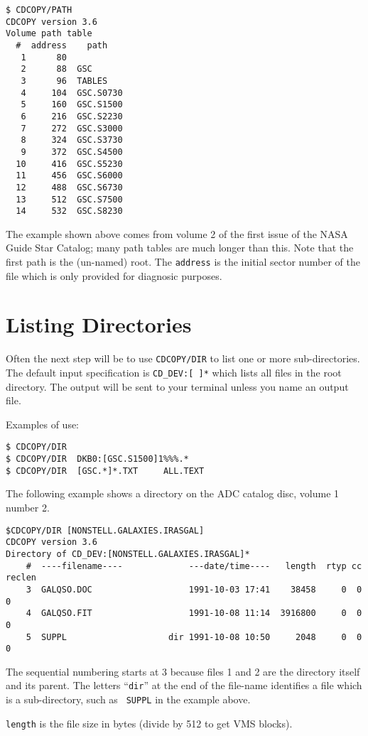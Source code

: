 \goodbreak
\begin{verbatim}
$ CDCOPY/PATH
CDCOPY version 3.6
Volume path table
  #  address    path
   1      80
   2      88  GSC
   3      96  TABLES
   4     104  GSC.S0730
   5     160  GSC.S1500
   6     216  GSC.S2230
   7     272  GSC.S3000
   8     324  GSC.S3730
   9     372  GSC.S4500
  10     416  GSC.S5230
  11     456  GSC.S6000
  12     488  GSC.S6730
  13     512  GSC.S7500
  14     532  GSC.S8230
\end{verbatim}
The example shown above comes from volume 2 of the first issue of the
NASA Guide Star Catalog; many path tables are much longer than this.
Note that the first path is the (un-named) root.  The {\tt address} is
the initial sector number of the file which is only provided
for diagnosic purposes.

\section{Listing Directories}

Often the next step will be to use {\tt CDCOPY/DIR} to list one or more
sub-directories.  The default input specification is {\tt CD\_DEV:[ ]*}
which lists all files in the root directory.  The output will be sent to
your terminal unless you name an output file.

Examples of use:
\begin{verbatim}
$ CDCOPY/DIR
$ CDCOPY/DIR  DKB0:[GSC.S1500]1%%%.*
$ CDCOPY/DIR  [GSC.*]*.TXT     ALL.TEXT
\end{verbatim}
The following example shows a directory on the ADC catalog disc, volume
1 number 2.
\goodbreak
\begin{verbatim}
$CDCOPY/DIR [NONSTELL.GALAXIES.IRASGAL]
CDCOPY version 3.6
Directory of CD_DEV:[NONSTELL.GALAXIES.IRASGAL]*
    #  ----filename----             ---date/time----   length  rtyp cc reclen
    3  GALQSO.DOC                   1991-10-03 17:41    38458     0  0     0
    4  GALQSO.FIT                   1991-10-08 11:14  3916800     0  0     0
    5  SUPPL                    dir 1991-10-08 10:50     2048     0  0     0
\end{verbatim}

The sequential numbering starts at 3 because files 1 and 2 are the
directory itself and its parent.  The letters ``{\tt dir}'' at the end
of the file-name identifies a file which is a sub-directory, such as {\tt
SUPPL} in the example above.

{\tt length} is the file size in bytes (divide by 512 to get VMS
blocks).

